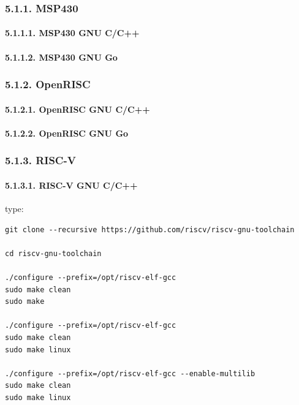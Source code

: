 \documentclass[
]{article}
\begin{document}
\hypertarget{msp430-4}{%
\subsubsection{5.1.1. MSP430}\label{msp430-4}}

\hypertarget{msp430-gnu-cc-1}{%
\paragraph{5.1.1.1. MSP430 GNU C/C++}\label{msp430-gnu-cc-1}}

\hypertarget{msp430-gnu-go-1}{%
\paragraph{5.1.1.2. MSP430 GNU Go}\label{msp430-gnu-go-1}}

\hypertarget{openrisc-4}{%
\subsubsection{5.1.2. OpenRISC}\label{openrisc-4}}

\hypertarget{openrisc-gnu-cc-1}{%
\paragraph{5.1.2.1. OpenRISC GNU C/C++}\label{openrisc-gnu-cc-1}}

\hypertarget{openrisc-gnu-go-1}{%
\paragraph{5.1.2.2. OpenRISC GNU Go}\label{openrisc-gnu-go-1}}

\hypertarget{risc-v-4}{%
\subsubsection{5.1.3. RISC-V}\label{risc-v-4}}

\hypertarget{risc-v-gnu-cc-1}{%
\paragraph{5.1.3.1. RISC-V GNU C/C++}\label{risc-v-gnu-cc-1}}

type:

\begin{verbatim}
git clone --recursive https://github.com/riscv/riscv-gnu-toolchain

cd riscv-gnu-toolchain

./configure --prefix=/opt/riscv-elf-gcc
sudo make clean
sudo make

./configure --prefix=/opt/riscv-elf-gcc
sudo make clean
sudo make linux

./configure --prefix=/opt/riscv-elf-gcc --enable-multilib
sudo make clean
sudo make linux
\end{verbatim}
\end{document}
